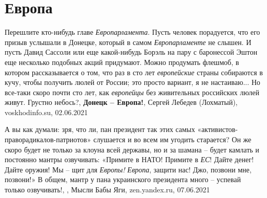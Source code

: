  
 
 
 
 
\chapter{Европа}

Перешлите кто-нибудь главе \emph{Европарламента}. Пусть человек порадуется, что
его призыв услышали в Донецке, который в самом \emph{Европарламенте} не слышен.
И пусть Давид Сассоли или еще какой-нибудь Борэль на пару с баронессой Эштон
еще несколько подобных акций придумают.  Можно продумать флешмоб, в котором
рассказывается о том, что раз в сто лет \emph{европейские} страны собираются в
кучу, чтобы получить люлей от России; это просто вариант, я не настаиваю... Но
все-таки скоро почти сто лет, как \emph{европейцы} без живительных российских
люлей живут.  Грустно небось?, 
\textbf{Донецк – Европа!}, Сергей Лебедев (Лохматый), voskhodinfo.su, 02.06.2021

А вы как думали: зря, что ли, пан президент так этих самых
«активистов-праворадикалов-патриотов» слушается и во всем им угодить старается?
Он же скоро будет не только за клоуна всей державы, но и за шамана – будет
камлать и постоянно мантры озвучивать: «Примите в НАТО! Примите в \emph{ЕС}!
Дайте денег! Дайте оружия! Мы – щит для \emph{Европы!} \emph{Европа}, защити
нас! Джо, позвони мне, позвони!» В общем, мантр у пана украинского президента
много – успевай только озвучивать!,
, Мысли Бабы Яги, zen.yandex.ru, 07.06.2021

